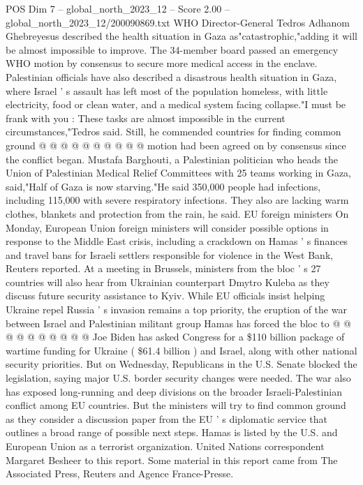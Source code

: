 \begin{textsample}{POS Dim 7 – global\_north\_2023\_12 – Score 2.00 – global\_north\_2023\_12/200090869.txt}
WHO Director-General Tedros Adhanom Ghebreyesus described the health situation in Gaza as"catastrophic,"adding it will be almost impossible to improve.
The 34-member board passed an emergency WHO motion by consensus to secure more medical access in the enclave.
Palestinian officials have also described a disastrous health situation in Gaza, where Israel ' s assault has left most of the population homeless, with little electricity, food or clean water, and a medical system facing collapse."I must be frank with you : These tasks are almost impossible in the current circumstances,"Tedros said.
Still, he commended countries for finding common ground @ @ @ @ @ @ @ @ @ @ motion had been agreed on by consensus since the conflict began.
Mustafa Barghouti, a Palestinian politician who heads the Union of Palestinian Medical Relief Committees with 25 teams working in Gaza, said,"Half of Gaza is now starving."He said 350,000 people had infections, including 115,000 with severe respiratory infections.
They also are lacking warm clothes, blankets and protection from the rain, he said.
EU foreign ministers On Monday, European Union foreign ministers will consider possible options in response to the Middle East crisis, including a crackdown on Hamas ' s finances and travel bans for Israeli settlers responsible for violence in the West Bank, Reuters reported.
At a meeting in Brussels, ministers from the bloc ' s 27 countries will also hear from Ukrainian counterpart Dmytro Kuleba as they discuss future security assistance to Kyiv.
While EU officials insist helping Ukraine repel Russia ' s invasion remains a top priority, the eruption of the war between Israel and Palestinian militant group Hamas has forced the bloc to @ @ @ @ @ @ @ @ @ @ Joe Biden has asked Congress for a \$110 billion package of wartime funding for Ukraine ( \$61.4 billion ) and Israel, along with other national security priorities.
But on Wednesday, Republicans in the U.S.
Senate blocked the legislation, saying major U.S. border security changes were needed.
The war also has exposed long-running and deep divisions on the broader Israeli-Palestinian conflict among EU countries.
But the ministers will try to find common ground as they consider a discussion paper from the EU ' s diplomatic service that outlines a broad range of possible next steps.
Hamas is listed by the U.S. and European Union as a terrorist organization.
United Nations correspondent Margaret Besheer to this report.
Some material in this report came from The Associated Press, Reuters and Agence France-Presse.

\end{textsample}
